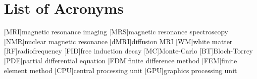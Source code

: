 \renewcommand{\BrainFuckChapter}{
{+}{+}{+}{+}{+}{+}{+}{+}{[}{>}{+}{+}{+}{+}{>}{+}{+}{+}{+}{+}{+}{>}{+}{+}{+}{+}{+}{+}{+}{+}{>}{+}{+}{+}{+}{+}{+}{+}{+}{+}{+}{>}{+}{+}{+}{+}{+}{+}{+}{+}{+}{+}{+}{+}{<}{<}{<}{<}{<}{-}{]}{>}{>}{>}{>}{-}{-}{-}{-}{.}
{>}{+}{+}{+}{+}{+}{+}{+}{+}{+}{.}{+}{+}{+}{+}{+}{+}{+}{+}{+}{+}{.}{+}{.}{<}{<}{<}{<}{.}{>}{>}{>}{>}{-}{-}{-}{-}{-}{.}{-}{-}{-}{-}{-}{-}{-}{-}{-}{.}{<}{<}{<}{<}{.}{>}{>}{+}{.}{>}{>}{-}{-}{-}{.}{+}{+}{+}{+}{+}{+}
{+}{+}{+}{+}{+}{+}{+}{+}{+}{.}{-}{-}{-}{.}{-}{.}{+}{+}{+}{+}{+}{+}{+}{+}{+}{+}{+}{.}{-}{-}{-}{-}{-}{-}{-}{-}{-}{-}{-}{-}{.}{+}{+}{+}{+}{+}{+}{.}{[}{>}{]}{<}{[}{[}{-}{]}{<}{]}{<}{-}{>}{-}{+}{-}{<}{-}{>}{-}{>}{+}
}
\chapter*{List of Acronyms}

\makeatletter
\patchcmd{\AC@@acro}{] #3}{] \MakeUppercase #3}{}{}
\patchcmd{\AC@@acro}{] #3}{] \MakeUppercase #3}{}{}
\makeatother
\begin{acronym}
  [MRI]{magnetic resonance imaging}
  [MRS]{magnetic resonance spectroscopy}
  [NMR]{nuclear magnetic resonance}
  [dMRI]{diffusion MRI}
  [WM]{white matter}
  [RF]{radiofrequency}
  [FID]{free induction decay}
  [MC]{Monte-Carlo}
  [BT]{Bloch-Torrey}
  [PDE]{partial differential equation}
  [FDM]{finite difference method}
  [FEM]{finite element method}
  [CPU]{central processing unit}
  [GPU]{graphics processing unit}
\end{acronym}


